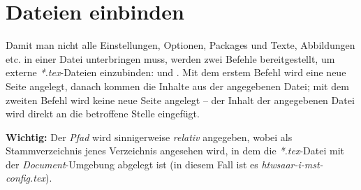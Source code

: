 \section{Dateien einbinden}

Damit man nicht alle Einstellungen, Optionen, Packages und Texte, Abbildungen etc. in einer Datei unterbringen muss, werden
zwei Befehle bereitgestellt, um externe \textit{*.tex}-Dateien einzubinden: \lstinline|| und \lstinline||.
Mit dem erstem Befehl wird eine neue Seite angelegt, danach kommen die Inhalte aus der angegebenen Datei; mit dem zweiten
Befehl wird keine neue Seite angelegt -- der Inhalt der angegebenen Datei wird direkt an die betroffene Stelle eingefügt.

\textbf{Wichtig:} Der \textit{Pfad} wird sinnigerweise \textit{relativ} angegeben, wobei als Stammverzeichnis jenes Verzeichnis
angesehen wird, in dem die \textit{*.tex}-Datei mit der \textit{Document}-Umgebung abgelegt ist (in diesem Fall ist es 
\textit{htwsaar-i-mst-config.tex}).